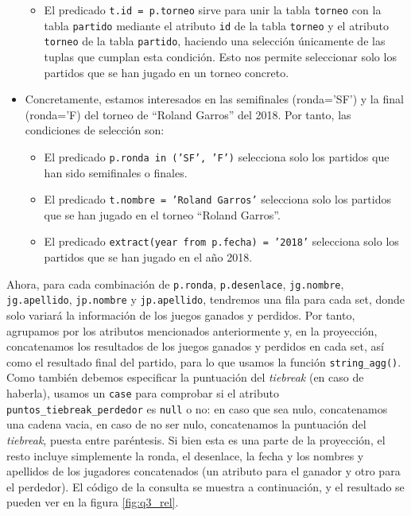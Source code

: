 \documentclass[11pt]{opticajnl}
\begin{document}
\begin{itemize}
\begin{itemize}
\item El predicado \texttt{t.id = p.torneo} sirve para unir la tabla \texttt{torneo} con la tabla \texttt{partido} mediante el atributo \texttt{id} de la tabla \texttt{torneo} y el atributo \texttt{torneo} de la tabla \texttt{partido}, haciendo una selección únicamente de las tuplas que cumplan esta condición. Esto nos permite seleccionar solo los partidos que se han jugado en un torneo concreto.
\end{itemize}
\item Concretamente, estamos interesados en las semifinales (ronda='SF') y la final (ronda='F) del torneo de ``Roland Garros'' del 2018. Por tanto, las condiciones de selección son:
\begin{itemize}
\item El predicado \texttt{p.ronda in ('SF', 'F')} selecciona solo los partidos que han sido semifinales o finales.
\item El predicado \texttt{t.nombre = 'Roland Garros'} selecciona solo los partidos que se han jugado en el torneo ``Roland Garros''.
\item El predicado \texttt{extract(year from p.fecha) = '2018'} selecciona solo los partidos que se han jugado en el año 2018.
\end{itemize}
\end{itemize}

Ahora, para cada combinación de \texttt{p.ronda}, \texttt{p.desenlace}, \texttt{jg.nombre}, \texttt{jg.apellido}, \texttt{jp.nombre} y \texttt{jp.apellido}, tendremos una fila para cada set, donde solo variará la información de los juegos ganados y perdidos. Por tanto, agrupamos por los atributos mencionados anteriormente y, en la proyección, concatenamos los resultados de los juegos ganados y perdidos en cada set, así como el resultado final del partido, para lo que usamos la función \texttt{string\_agg()}. Como también debemos especificar la puntuación del \textit{tiebreak} (en caso de haberla), usamos un \texttt{case} para comprobar si el atributo \texttt{puntos\_tiebreak\_perdedor} es \texttt{null} o no: en caso que sea nulo, concatenamos una cadena vacia, en caso de no ser nulo, concatenamos la puntuación del \textit{tiebreak}, puesta entre paréntesis. Si bien esta es una parte de la proyección, el resto incluye simplemente la ronda, el desenlace, la fecha y los nombres y apellidos de los jugadores concatenados (un atributo para el ganador y otro para el perdedor). El código de la consulta se muestra a continuación, y el resultado se pueden ver en la figura \ref{fig:q3_rel}.
\end{document}
